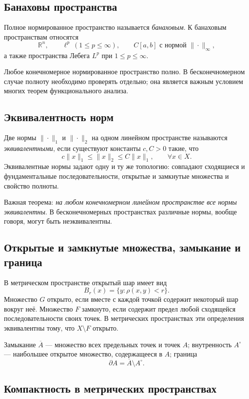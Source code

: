 \subsection{Банаховы пространства}

Полное нормированное пространство называется \emph{банаховым}. К банаховым
пространствам относятся
\[
    \mathbb R^n,\qquad \ell^p\ (1\leq p\leq\infty),\qquad
    C[a,b]\text{ с нормой }\|\cdot\|_\infty,
\]
а также пространства Лебега $L^p$ при $1\leq p\leq\infty$.

Любое конечномерное нормированное пространство полно. В бесконечномерном случае
полноту необходимо проверять отдельно; она является важным условием многих
теорем функционального анализа.

\subsection{Эквивалентность норм}

Две нормы $\|\cdot\|_1$ и $\|\cdot\|_2$ на одном линейном пространстве называются
\emph{эквивалентными}, если существуют константы $c,C>0$ такие, что
\[
    c\|x\|_1\leq\|x\|_2\leq C\|x\|_1,
    \qquad \forall x\in X.
\]
Эквивалентные нормы задают одну и ту же топологию: совпадают сходящиеся и
фундаментальные последовательности, открытые и замкнутые множества и свойство
полноты.

Важная теорема: \emph{на любом конечномерном линейном пространстве все нормы
эквивалентны}. В бесконечномерных пространствах различные нормы, вообще говоря,
могут быть неэквивалентны.


\subsection{Открытые и замкнутые множества, замыкание и граница}

В метрическом пространстве открытый шар имеет вид
\[
B_r(x)=\{y:\rho(x,y)<r\}.
\]
Множество $G$ открыто, если вместе с каждой точкой содержит некоторый шар вокруг
неё. Множество $F$ замкнуто, если содержит предел любой сходящейся последовательности
своих точек. В метрических пространствах эти определения эквивалентны тому, что
$X\setminus F$ открыто.

Замыкание $\overline A$ --- множество всех предельных точек и точек $A$;
внутренность $A^\circ$ --- наибольшее открытое множество, содержащееся в $A$;
граница
\[
    \partial A=\overline A\setminus A^\circ.
\]

\subsection{Компактность в метрических пространствах}

